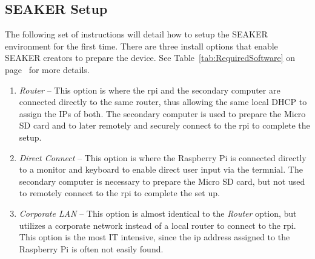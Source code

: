 \documentclass[12pt]{article}
\begin{document}
\subsection{SEAKER Setup}
The following set of instructions will detail how to setup the SEAKER
environment for the first time. There are three install options that
enable SEAKER creators to prepare the device.  See
Table~\ref{tab:RequiredSoftware} on page~\pageref{tab:RequiredSoftware}
for more details.

\vspace{0.5 cm}
\begin{enumerate}
  \item {\em Router} -- This option is where the \gls{rpi} and the
  secondary computer are connected directly to the same router, thus
  allowing the same local DHCP to assign the IPs of both.  The
  secondary computer is used to prepare the Micro SD card and to later
  remotely and securely connect to the \gls{rpi} to complete the
  setup.
  
  \item {\em Direct Connect} -- This option is where the Raspberry Pi
  is connected directly to a monitor and keyboard to enable direct
  user input via the termnial.  The secondary computer is necessary to
  prepare the Micro SD card, but not used to remotely connect to the
  \gls{rpi} to complete the set up.

  \item {\em Corporate LAN} -- This option is almost identical to the
  {\em Router} option, but utilizes a corporate network instead of
  a local router to connect to the \gls{rpi}.  This option is the
  most IT intensive, since the \gls{ip} address assigned to the Raspberry
  Pi is often not easily found.
\end{enumerate}
\vspace{0.5 cm}
\end{document}
